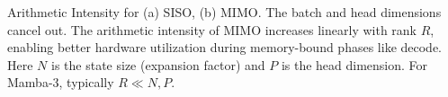 \begin{table}[t]
  \centering

  \caption{
  Arithmetic Intensity for (a) SISO, (b) MIMO.
  The batch and head dimensions cancel out.
  The arithmetic intensity of MIMO increases linearly with rank $R$, enabling better hardware utilization during memory-bound phases like decode.
  Here $N$ is the state size (expansion factor) and $P$ is the head dimension. For Mamba-3, typically $R \ll N, P$.
  }

  \begin{subtable}[b]{0.48\linewidth}
    \small\centering
    \caption{SISO (2-byte data).}
    \label{tab:arith_intensity_siso}
  \end{subtable}\hfill
  \begin{subtable}[b]{0.48\linewidth}
    \small\centering
\end{subtable}
\end{table}
